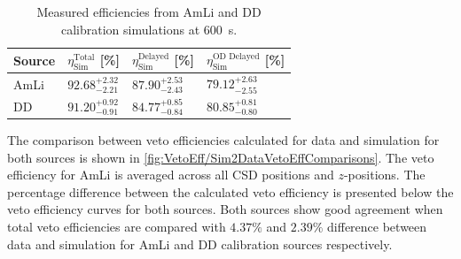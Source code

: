 \renewcommand{\arraystretch}{1.5}
\begin{table}[h!]
    \centering
    \caption{Measured efficiencies from AmLi and DD calibration simulations at 600~\textmu s.}
    \begin{tabular}{llll}
    \hline\hline
    \textbf{Source} & \textbf{$\eta^\text{Total}_\text{Sim}$ [\%]} & \textbf{$\eta^\text{Delayed}_\text{Sim}$ [\%]} & \textbf{$\eta^\text{OD Delayed}_\text{Sim}$ [\%]}\\
    \hline
    AmLi & $92.68^{+2.32}_{-2.21}$ & $87.90^{+2.53}_{-2.43}$ & $79.12^{+2.63}_{-2.55}$ \\
    DD & $91.20^{+0.92}_{-0.91}$ & $84.77^{+0.85}_{-0.84}$ & $80.85^{+0.81}_{-0.80}$\\
    \hline\hline
    \end{tabular}
    \label{tab:VetoEff/CalibrationSimulationEfficiencies}
\end{table}
\renewcommand{\arraystretch}{1}

The comparison between veto efficiencies calculated for data and simulation for both sources is shown in \autoref{fig:VetoEff/Sim2DataVetoEffComparisons}. The veto efficiency for AmLi is averaged across all CSD positions and $z$-positions. The percentage difference between the calculated veto efficiency is presented below the veto efficiency curves for both sources. Both sources show good agreement when total veto efficiencies are compared with $4.37\%$ and $2.39\%$ difference between data and simulation for AmLi and DD calibration sources respectively.

